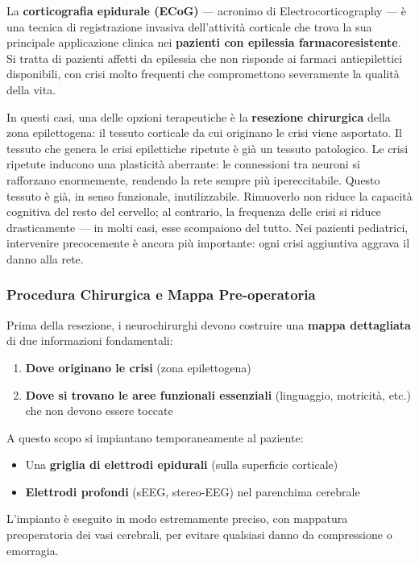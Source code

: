 La \textbf{corticografia epidurale (ECoG)} — acronimo di Electrocorticography — è una tecnica di registrazione invasiva dell'attività corticale che trova la sua principale applicazione clinica nei \textbf{pazienti con epilessia farmacoresistente}. Si tratta di pazienti affetti da epilessia che non risponde ai farmaci antiepilettici disponibili, con crisi molto frequenti che compromettono severamente la qualità della vita.

In questi casi, una delle opzioni terapeutiche è la \textbf{resezione chirurgica} della zona epilettogena: il tessuto corticale da cui originano le crisi viene asportato.  Il tessuto che genera le crisi epilettiche ripetute è già un tessuto patologico. Le crisi ripetute inducono una plasticità aberrante: le connessioni tra neuroni si rafforzano enormemente, rendendo la rete sempre più ipereccitabile. Questo tessuto è già, in senso funzionale, inutilizzabile. Rimuoverlo non riduce la capacità cognitiva del resto del cervello; al contrario, la frequenza delle crisi si riduce drasticamente — in molti casi, esse scompaiono del tutto. Nei pazienti pediatrici, intervenire precocemente è ancora più importante: ogni crisi aggiuntiva aggrava il danno alla rete.


\subsubsection{Procedura Chirurgica e Mappa Pre-operatoria}

Prima della resezione, i neurochirurghi devono costruire una \textbf{mappa dettagliata} di due informazioni fondamentali:

\begin{enumerate}
    \item \textbf{Dove originano le crisi} (zona epilettogena)
    \item \textbf{Dove si trovano le aree funzionali essenziali} (linguaggio, motricità, etc.) che non devono essere toccate
\end{enumerate}

A questo scopo si impiantano temporaneamente al paziente:
\begin{itemize}
    \item Una \textbf{griglia di elettrodi epidurali} (sulla superficie corticale)
    \item \textbf{Elettrodi profondi} (sEEG, stereo-EEG) nel parenchima cerebrale
\end{itemize}

L'impianto è eseguito in modo estremamente preciso, con mappatura preoperatoria dei vasi cerebrali, per evitare qualsiasi danno da compressione o emorragia.

